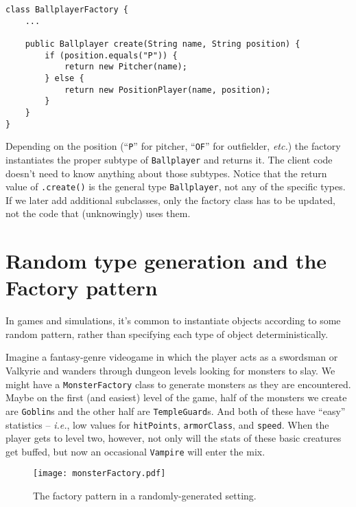 \begin{Verbatim}[fontsize=\small,samepage=true,frame=single]
class BallplayerFactory {
    ...

    public Ballplayer create(String name, String position) {
        if (position.equals("P")) {
            return new Pitcher(name);
        } else {
            return new PositionPlayer(name, position);
        }
    }
}
\end{Verbatim}

Depending on the position (``\texttt{P}'' for pitcher, ``\texttt{OF}'' for
outfielder, \textit{etc.}) the factory instantiates the proper subtype of
\texttt{Ballplayer} and returns it. The client code doesn't need to know
anything about those subtypes. Notice that the return value of
\texttt{.create()} is the general type \texttt{Ballplayer}, not any of the
specific types. If we later add additional subclasses, only the factory class
has to be updated, not the code that (unknowingly) uses them.

\section{Random type generation and the Factory pattern}

In games and simulations, it's common to instantiate objects according to some
random pattern, rather than specifying each type of object deterministically.

Imagine a fantasy-genre videogame in which the player acts as a swordsman or
Valkyrie and wanders through dungeon levels looking for monsters to slay. We
might have a \texttt{MonsterFactory} class to generate monsters as they are
encountered. Maybe on the first (and easiest) level of the game, half of the
monsters we create are \texttt{Goblin}s and the other half are
\texttt{TempleGuard}s. And both of these have ``easy'' statistics --
\textit{i.e.}, low values for \texttt{hitPoints}, \texttt{armorClass}, and
\texttt{speed}. When the player gets to level two, however, not only will the
stats of these basic creatures get buffed, but now an occasional
\texttt{Vampire} will enter the mix.

\begin{figure}
\centering
\texttt{[image: monsterFactory.pdf]}
\caption{The factory pattern in a randomly-generated setting.}
\label{fig:monsterFactory}
\end{figure}


